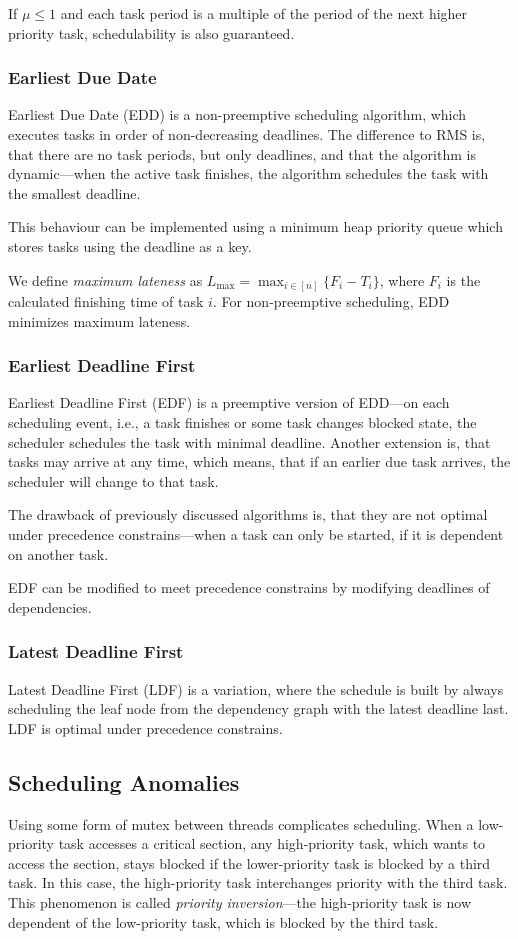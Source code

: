If \(\mu \le 1\) and each task period is a multiple of the period of the next higher priority task, schedulability is also guaranteed.

\subsubsection{Earliest Due Date}
Earliest Due Date (EDD) is a non-preemptive scheduling algorithm, which executes tasks in order of non-decreasing deadlines.
The difference to RMS is, that there are no task periods, but only deadlines, and that the algorithm is dynamic---when the active task finishes, the algorithm schedules the task with the smallest deadline.

This behaviour can be implemented using a minimum heap priority queue which stores tasks using the deadline as a key.

We define \emph{maximum lateness} as \(L_\text{max} = \max_{i \in [n]}\{F_i - T_i\}\), where \(F_i\) is the calculated finishing time of task \(i\).
For non-preemptive scheduling, EDD minimizes maximum lateness.

\subsubsection{Earliest Deadline First}
Earliest Deadline First (EDF) is a preemptive version of EDD---on each scheduling event, i.e., a task finishes or some task changes blocked state, the scheduler schedules the task with minimal deadline.
Another extension is, that tasks may arrive at any time, which means, that if an earlier due task arrives, the scheduler will change to that task.

The drawback of previously discussed algorithms is, that they are not optimal under precedence constrains---when a task can only be started, if it is dependent on another task.

EDF can be modified to meet precedence constrains by modifying deadlines of dependencies.

\subsubsection{Latest Deadline First}
Latest Deadline First (LDF) is a variation, where the schedule is built by always scheduling the leaf node from the dependency graph with the latest deadline last.
LDF is optimal under precedence constrains.

\subsection{Scheduling Anomalies}
Using some form of mutex between threads complicates scheduling.
When a low-priority task accesses a critical section, any high-priority task, which wants to access the section, stays blocked if the lower-priority task is blocked by a third task.
In this case, the high-priority task interchanges priority with the third task.
This phenomenon is called \emph{priority inversion}---the high-priority task is now dependent of the low-priority task, which is blocked by the third task.

